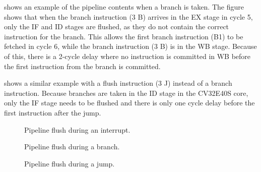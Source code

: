  shows an example of the pipeline contents when a branch is taken. The figure shows that when the branch instruction (3 B) arrives in the EX stage in cycle 5, only the IF and ID stages are flushed, as they do not contain the correct instruction for the branch. This allows the first branch instruction (B1) to be fetched in cycle 6, while the branch instruction (3 B) is in the WB stage. Because of this, there is a 2-cycle delay where no instruction is committed in WB before the first instruction from the branch is committed.

 shows a similar example with a flush instruction (3 J) instead of a branch instruction. Because branches are taken in the ID stage in the CV32E40S core, only the IF stage needs to be flushed and there is only one cycle delay before the first instruction after the jump.

\begin{figure}[htbp]
\centering

\caption{Pipeline flush during an interrupt.}
\label{fig:interrupt_flush}
\end{figure}

\begin{figure}[htbp]
\centering

\caption{Pipeline flush during a branch.}
\label{fig:branch_flush}
\end{figure}

\begin{figure}[htbp]
\centering

\caption{Pipeline flush during a jump.}
\label{fig:jump_flush}
\end{figure}


%            
%        
%            
%            
%    



